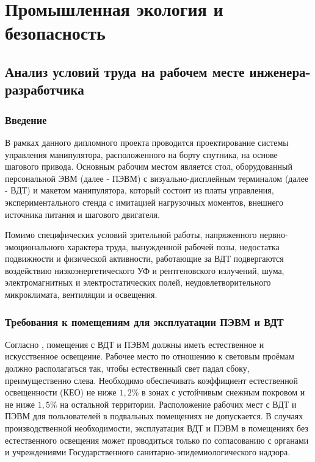 \newpage
\section{Промышленная экология и безопасность}

\subsection{Анализ условий труда на рабочем месте инженера-разработчика}

\subsubsection{Введение}

В рамках данного дипломного проекта проводится проектирование системы управления
манипулятора, расположенного на борту спутника, на основе шагового привода.
Основным рабочим местом является стол, оборудованный персональной ЭВМ
(далее - ПЭВМ) с визуально-дисплейным терминалом (далее - ВДТ) и макетом
манипулятора, который состоит из платы управления, экспериментального стенда с
имитацией нагрузочных моментов, внешнего источника питания и шагового двигателя.


Помимо специфических условий зрительной работы, напряженного
нервно-эмоционального характера труда, вынужденной рабочей позы, недостатка
подвижности и физической активности, работающие за ВДТ подвергаются воздействию
низкоэнергетического УФ и рентгеновского излучений, шума, электромагнитных и
электростатических полей, неудовлетворительного микроклимата, вентиляции и
освещения.

\subsubsection{Требования к помещениям для эксплуатации ПЭВМ и ВДТ}

Согласно \cite{ecology_sanpin_1340_03}, помещения с ВДТ и ПЭВМ должны
иметь естественное и искусственное освещение. Рабочее место по отношению к
световым проёмам должно располагаться так, чтобы естественный свет падал сбоку,
преимущественно слева. Необходимо обеспечивать коэффициент естественной освещенности
(КЕО) не ниже $1,2 \%$ в зонах с устойчивым снежным покровом и не ниже
$1,5 \%$ на остальной территории.
Расположение рабочих мест с ВДТ и ПЭВМ для пользователей в подвальных помещениях не
допускается. В случаях производственной необходимости, эксплуатация ВДТ и ПЭВМ в
помещениях без естественного освещения может проводиться только по согласованию
с органами и учреждениями Государственного санитарно-эпидемиологического надзора.

